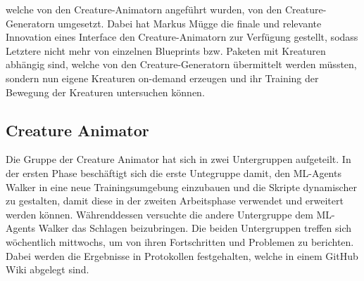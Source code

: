 welche von den Creature-Animatorn angeführt wurden, von den Creature-Generatorn umgesetzt. Dabei hat Markus Mügge die finale und relevante Innovation eines Interface den Creature-Animatorn zur Verfügung gestellt, sodass Letztere nicht mehr von einzelnen Blueprints bzw. Paketen mit Kreaturen abhängig sind, welche von den Creature-Generatorn übermittelt werden müssten, sondern nun eigene Kreaturen on-demand erzeugen und ihr Training der Bewegung der Kreaturen untersuchen können.



\subsection{Creature Animator}\label{sec:creature-animation-orga}
Die Gruppe der Creature Animator hat sich in zwei Untergruppen aufgeteilt. In der ersten Phase beschäftigt sich die erste Untegruppe damit, den ML-Agents Walker in eine neue Trainingsumgebung einzubauen und die Skripte dynamischer zu gestalten, damit diese in der zweiten Arbeitsphase verwendet und erweitert werden können. Währenddessen versuchte die andere Untergruppe dem ML-Agents Walker das Schlagen beizubringen. Die beiden Untergruppen treffen sich wöchentlich mittwochs, um von ihren Fortschritten und Problemen zu berichten. Dabei werden die Ergebnisse in Protokollen festgehalten, welche in einem GitHub Wiki abgelegt sind.

